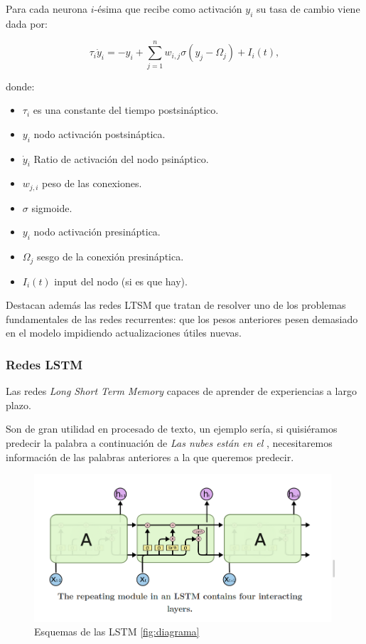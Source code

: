 \documentclass[11pt,twoside,titlepage,a4paper]{article}
\numberwithin{equation}{section} %
\theoremstyle{usual}
\begin{document}
Para cada neurona $i$-ésima que recibe como activación $y_i$ su tasa de cambio viene dada por: 

\begin{equation}
\tau _i \dot{y}_i = -y_i + \sum_{j=1}^n w_{i,j} \sigma( y_j - \Omega _ j) + I_ i(t),   
\end{equation}

donde:
\begin{itemize}
\item $\tau_i$ es una constante del tiempo postsináptico. 
\item $y_i$ nodo activación postsináptica.
\item $\dot{y}_i$ Ratio de activación del nodo psináptico. 
\item $w_{j,i}$ peso de las conexiones. 
\item $\sigma$ sigmoide.
\item $y_i$ nodo activación presináptica.
\item $\Omega_j$ sesgo de la conexión presináptica. 
\item $I_i(t)$ input del nodo (si es que hay). 
\end{itemize}

Destacan además las redes LTSM que tratan de resolver uno de los problemas fundamentales de las redes recurrentes: que los pesos anteriores pesen demasiado en el modelo impidiendo actualizaciones útiles nuevas. 

\subsubsection{Redes LSTM}  

\cite{LSMTM-web} 

Las redes \textit{Long Short Term Memory} \cite{LSMTM-paper} capaces de aprender de experiencias a largo plazo. 

Son de gran utilidad en procesado de texto, un ejemplo sería, si quisiéramos  predecir la palabra a continuación de  \textit{ Las nubes están en el }, necesitaremos información de las palabras anteriores a la que queremos predecir.  


  \begin{figure}[!h]
        \centering
        \includegraphics[width=\textwidth]{Source/images/LSTM.png}
        \caption{Esquemas de las LSTM \ref{fig:diagrama}}
        \label{fig:Esquema del LSTM}
    \end{figure}
    
\end{document}
